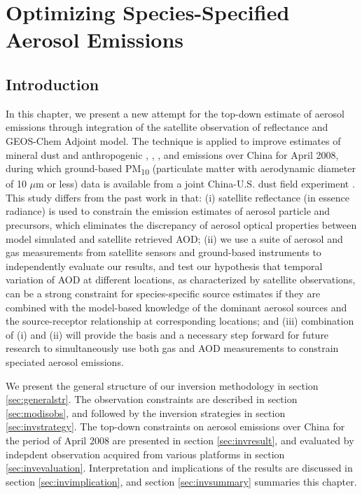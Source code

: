 \chapter{Optimizing Species-Specified Aerosol Emissions} \label{chap:optems}

\section{Introduction}

 In this chapter, we present a new attempt for the top-down estimate 
 of aerosol emissions through integration of the satellite observation 
 of reflectance and GEOS-Chem Adjoint model. 
 The technique is applied to improve estimates of mineral dust 
 and anthropogenic , , ,  and  
 emissions over China for April 2008, during which ground-based 
 PM\textsubscript{10} (particulate matter with aerodynamic diameter of 
 10 $\mu$m or less) data is available from a joint China-U.S. 
 dust field experiment \citep{huang10}. 
 This study differs from the past work in that: 
 (i) satellite reflectance (in essence radiance) is used 
 to constrain the emission estimates of aerosol particle and precursors, 
 which eliminates the discrepancy of aerosol optical properties 
 between model simulated and satellite retrieved AOD; 
 (ii) we use a suite of aerosol and gas measurements 
 from satellite sensors and ground-based instruments 
 to independently evaluate our results, and test our hypothesis 
 that temporal variation of AOD at different locations, 
 as characterized by satellite observations, can be a strong constraint 
 for species-specific source estimates if they are combined with 
 the model-based knowledge of the dominant aerosol sources 
 and the source-receptor relationship at corresponding locations; 
 and (iii) combination of (i) and (ii) will provide the basis and 
 a necessary step forward for future research to simultaneously 
 use both gas and AOD measurements to constrain speciated aerosol emissions. 

 We present the general structure of our inversion methodology in section \ref{sec:generalstr}. 
 The observation constraints are described in section \ref{sec:modisobs}, 
 and followed by the inversion strategies in section \ref{sec:invstrategy}. 
 The top-down constraints on aerosol emissions over China 
 for the period of April 2008 are presented in section \ref{sec:invresult}, 
 and evaluated by indepdent observation acquired from various platforms in section \ref{sec:invevaluation}.
 Interpretation and implications of the results are discussed in section \ref{sec:invimplication}, 
 and section \ref{sec:invsummary} summaries this chapter.

